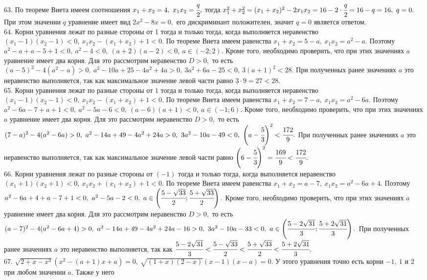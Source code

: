 \documentclass[12pt]{article}
\begin{document}
63. По теореме Виета имеем соотношения $x_1+x_2=4,\ x_1x_2=\cfrac{q}{2},$ тогда $x_1^2+x_2^2=(x_1+x_2)^2-2x_1x_2=16-2\cdot\cfrac{q}{2}=16-q=16,\ q=0.$ При этом значении $q$ уравнение имеет вид $2x^2-8x=0,$ его дискриминант положителен, значит $q=0$ является ответом.\\
64. Корни уравнения лежат по разные стороны от 1 тогда и только тогда, когда выполняется неравенство $(x_1-1)(x_2-1)<0,\ x_1x_2-(x_1+x_2)+1<0.$ По теореме Виета имеем равенства $x_1+x_2=5-a,\ x_1x_2=a^2-a.$ Поэтому $a^2-a+a-5+1<0,\
a^2-4<0,\ (a+2)(a-2)<0,\ a\in(-2;2).$ Кроме того, необходимо проверить, что при этих значениях $a$ уравнение имеет два корня. Для это рассмотрим неравенство $D>0,$ то есть $(a-5)^2-4(a^2-a)>0,\ a^2-10a+25-4a^2+4a>0,\ 3a^2+6a-25<0,\ 3(a+1)^2<28.$ При полученных ранее значениях $a$ это неравенство выполняется, так как максимальное значение левой части равно $3\cdot9=27<28.$\\
65. Корни уравнения лежат по разные стороны от $1$ тогда и только тогда, когда выполняется неравенство $(x_1-1)(x_2-1)<0,\ x_1x_2-(x_1+x_2)+1<0.$ По теореме Виета имеем равенства $x_1+x_2=7-a,\ x_1x_2=a^2-6a.$ Поэтому $a^2-6a-7+a+1<0,\ a^2-5a-6<0,\ (a-6)(a+1)<0,\ a\in(-1;6).$ Кроме того, необходимо проверить, что при этих значениях $a$ уравнение имеет два корня. Для это рассмотрим неравенство $D>0,$ то есть $(7-a)^2-4(a^2-6a)>0,\ a^2-14a+49-4a^2+24a>0,\ 3a^2-10a-49<0,\ \left(a-\cfrac{5}{3}\right)^2<\cfrac{172}{9}.$ При полученных ранее значениях $a$ это неравенство выполняется, так как максимальное значение левой части равно $\left(6-\cfrac{5}{3}\right)^2=\cfrac{169}{9}<\cfrac{172}{9}.$\\
66. Корни уравнения лежат по разные стороны от $(-1)$ тогда и только тогда, когда выполняется неравенство $(x_1+1)(x_2+1)<0,\ x_1x_2+(x_1+x_2)+1<0.$ По теореме Виета имеем равенства $x_1+x_2=a-7,\ x_1x_2=a^2-6a+4.$ Поэтому $a^2-6a+4+a-7+1<0,\ a^2-5a-2<0,\ a\in\left(\cfrac{5-\sqrt{33}}{2};\cfrac{5+\sqrt{33}}{2}\right).$ Кроме того, необходимо проверить, что при этих значениях $a$ уравнение имеет два корня. Для это рассмотрим неравенство $D>0,$ то есть $(a-7)^2-4(a^2-6a+4)>0,\ a^2-14a+49-4a^2+24a-16>0,\ 3a^2-10a-33<0,\ a\in\left(\cfrac{5-2\sqrt{31}}{3};\cfrac{5+2\sqrt{31}}{3}\right).$ При полученных ранее значениях $a$ это неравенство выполняется, так как $\cfrac{5-2\sqrt{31}}{3}<\cfrac{5-\sqrt{33}}{2}<\cfrac{5+\sqrt{33}}{2}<\cfrac{5+2\sqrt{31}}{3}.$\\
67. $\sqrt{2+x-x^2}(x^2-(a+1)x+a)=0,\ \sqrt{(1+x)(2-x)}(x-1)(x-a)=0.$ У этого уравнения точно есть корни $-1,\ 1$ и 2 при любом значении $a.$ Также у него
\end{document}
